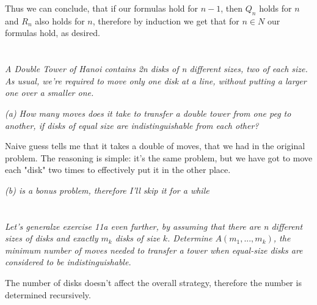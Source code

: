 \documentclass[11pt,oneside,titlepage]{book}
\begin{document}
Thus we can conclude, that if our formulas hold for $n - 1$, then $Q_n$ holds for $n$ and
$R_n$ also holds for $n$, therefore by induction we get that for $n \in N$ our formulas hold, as
desired.


\section{}

\textit{A Double Tower of Hanoi contains 2n disks of n different sizes, two of each size. As
  usual, we're required to move only one disk at a line, without putting a larger one
  over a smaller one.}

\textit{(a) How many moves does it take to transfer a double tower from one peg to
  another, if disks of equal size are indistinguishable from each other?}

Naive guess tells me that it takes a double of moves, that we had in the original problem.
The reasoning is simple: it's the same problem, but we have got to move each "disk" two times
to effectively put it in the other place.

\textit{(b) is a bonus problem, therefore I'll skip it for a while}

\section{}

\textit{Let's generalze exercise 11a even further, by assuming that there are n different
  sizes of disks and exactly $m_k$ disks of size $k$. Determine
  $A(m_1, ..., m_k)$, the minimum number of moves needed to transfer a tower when equal-size
  disks are considered to be indistinguishable.}

The number of disks doesn't affect the overall strategy, therefore the number is determined
recursively.
\end{document}
